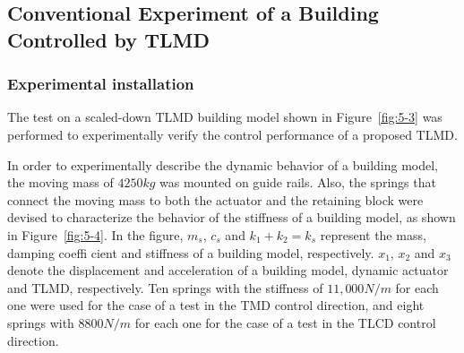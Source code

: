 
\subsection{Conventional Experiment of a Building Controlled by TLMD}

\subsubsection{Experimental installation}

The test on a scaled-down TLMD building model shown in Figure~\ref{fig:5-3} was performed to experimentally verify the control performance of a proposed TLMD.

In order to experimentally describe the dynamic behavior of a building model, the moving mass of $4250 kg$ was mounted on guide rails. Also, the springs that connect the moving mass to both the actuator and the retaining block were devised to characterize the behavior of the stiffness of a building model, as shown in Figure~\ref{fig:5-4}. In the figure, $m_{s}$, $c_{s}$ and $k_{1} + k_{2} = k_{s}$ represent the mass, damping coeffi cient and stiffness of a building model, respectively. $x_{1}$, $x_{2}$ and $x_{3}$ denote the displacement and acceleration of a building model, dynamic actuator and TLMD, respectively. Ten springs with the stiffness of $11,000 N/m$ for each one were used for the case of a test in the TMD control direction, and eight springs with $8800 N/m$ for each one for the case of a test in the TLCD control direction.

